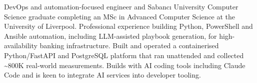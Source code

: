 



DevOps and automation-focused engineer and Sabancı University Computer Science graduate completing an MSc in Advanced Computer Science at the University of Liverpool. Professional experience building Python, PowerShell and Ansible automation, including LLM-assisted playbook generation, for high-availability banking infrastructure. Built and operated a containerised Python/FastAPI and PostgreSQL platform that ran unattended and collected \textasciitilde 800K real-world measurements. Builds with AI coding tools including Claude Code and is keen to integrate AI services into developer tooling.




